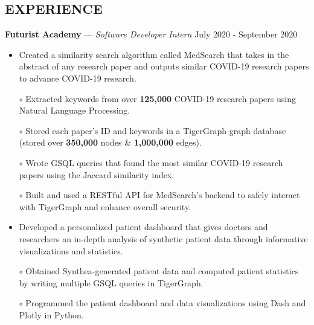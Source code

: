 \documentclass[11pt]{res}
\begin{document}
\begin{footnotesize}
\begin{resume}
\begin{small}
\section{EXPERIENCE}
\end{small}
\vspace{.5mm}
\textbf{Futurist Academy} — {\sl Software Developer Intern} \hfill July 2020 - September 2020\vspace{-5mm}
\begin{itemize}[leftmargin=6.25mm]
\item Created a similarity search algorithm called MedSearch that takes in the abstract of any research paper and outputs similar COVID-19 research papers to advance COVID-19 research.
\end{itemize}
\vspace{-6.4mm}
\begin{itemize} \itemsep -2pt 
\item[$\circ$] Extracted keywords from over \textbf{125,000} COVID-19 research papers using Natural Language Processing.
\vspace{1mm}
\item[$\circ$] Stored each paper's ID and keywords in a TigerGraph graph database (stored over \textbf{350,000} nodes \& \textbf{1,000,000} edges).
\vspace{1mm}
\item[$\circ$] Wrote GSQL queries that found the most similar COVID-19 research papers using the Jaccard similarity index.
\vspace{1mm}
\item[$\circ$] Built and used a RESTful API for MedSearch's backend to safely interact with TigerGraph and enhance overall security.
\end{itemize}
\vspace{-6mm}
\begin{itemize}[leftmargin=6.25mm]
\item Developed a personalized patient dashboard that gives doctors and researchers an in-depth analysis of synthetic patient data through informative visualizations and statistics.
\end{itemize}
\vspace{-6.95mm}
\begin{itemize} \itemsep -2pt 
\item[$\circ$] Obtained Synthea-generated patient data and computed patient statistics by writing multiple GSQL queries in TigerGraph.
\vspace{1mm}
\item[$\circ$] Programmed the patient dashboard and data visualizations using Dash and Plotly in Python.

\end{itemize}
\end{resume}
\end{footnotesize}
\end{document}
